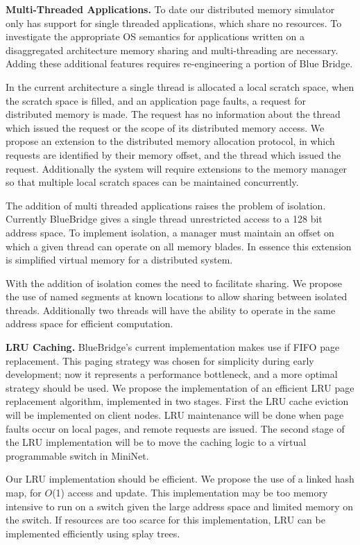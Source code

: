 \textbf{Multi-Threaded Applications.} To date our
distributed memory simulator only has support for single threaded
applications, which share no resources. To investigate the appropriate
OS semantics for applications written on a disaggregated architecture
memory sharing and multi-threading are necessary. Adding these
additional features requires re-engineering a portion of Blue Bridge.

In the current architecture a single thread is allocated a local
scratch space, when the scratch space is filled, and an application
page faults, a request for distributed memory is made. The request has
no information about the thread which issued the request or the scope
of its distributed memory access. We propose an extension to the
distributed memory allocation protocol, in which requests are
identified by their memory offset, and the thread which issued the
request. Additionally the system will require extensions to the memory
manager so that multiple local scratch spaces can be maintained
concurrently.

The addition of multi threaded applications raises the problem of
isolation. Currently BlueBridge gives a single thread unrestricted
access to a 128 bit address space. To implement isolation, a manager
must maintain an offset on which a given thread can operate on all
memory blades. In essence this extension is simplified virtual memory
for a distributed system.

With the addition of isolation comes the need to facilitate sharing.
We propose the use of named segments at known locations to allow
sharing between isolated threads. Additionally two threads will have
the ability to operate in the same address space for efficient
computation.

\textbf{LRU Caching.} BlueBridge's current implementation
makes use if FIFO page replacement. This paging strategy was chosen
for simplicity during early development; now it represents a
performance bottleneck, and a more optimal strategy should be used. We
propose the implementation of an efficient LRU page replacement
algorithm, implemented in two stages. First the LRU cache eviction
will be implemented on client nodes. LRU maintenance will be done when
page faults occur on local pages, and remote requests are issued. The
second stage of the LRU implementation will be to move the caching
logic to a virtual programmable switch in MiniNet.

Our LRU implementation should be efficient. We propose the use of a
linked hash map, for $O$(1) access and update. This implementation may
be too memory intensive to run on a switch given the large address
space and limited memory on the switch. If resources are too scarce
for this implementation, LRU can be implemented efficiently using
splay trees.

